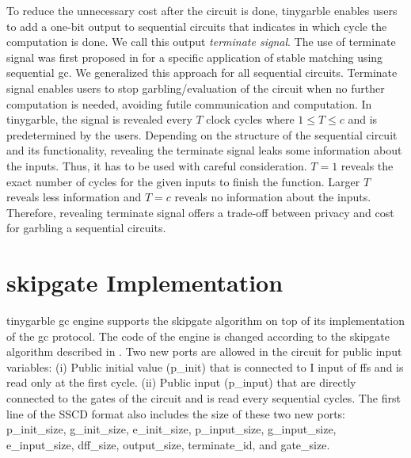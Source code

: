 To reduce the unnecessary cost after the circuit is done, \gls{tinygarble} enables users to add a one-bit output to sequential circuits that indicates in which cycle the computation is done.
We call this output \textit{terminate signal}.
The use of terminate signal was first proposed in \cite{riazi2017toward} for a specific application of stable matching using sequential \acrshort{gc}.
We generalized this approach for all sequential circuits.
Terminate signal enables users to stop garbling/evaluation of the circuit when no further computation is needed, avoiding futile communication and computation.
In \gls{tinygarble}, the signal is revealed every $T$ clock cycles where $1 \le T \le c$ and is predetermined by the users.
Depending on the structure of the sequential circuit and its functionality, revealing the terminate signal leaks some information about the inputs.
Thus, it has to be used with careful consideration.
$T=1$ reveals the exact number of cycles for the given inputs to finish the function.
Larger $T$ reveals less information and $T=c$ reveals no information about the inputs.
Therefore, revealing terminate signal offers a trade-off between privacy and cost for garbling a sequential circuits.

\section{{\gls{skipgate}} Implementation}\label{sec:engine-skipgate}
\gls{tinygarble} \acrshort{gc} engine supports the \gls{skipgate} algorithm on top of its implementation of the \acrshort{gc} protocol.
The code of the engine is changed according to the \gls{skipgate} algorithm described in .
Two new ports are allowed in the circuit for public input variables: (i) Public initial value (p\_init) that is connected to I input of \acrshort{ff}s and is read only at the first cycle. (ii) Public input (p\_input) that are directly connected to the gates of the circuit and is read every sequential cycles.
The first line of the SSCD format also includes the size of these two new ports: p\_init\_size,  g\_init\_size, e\_init\_size, p\_input\_size, g\_input\_size, e\_input\_size, dff\_size, output\_size, terminate\_id, and gate\_size.
